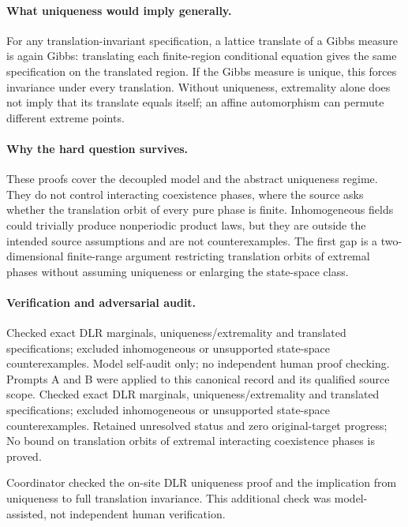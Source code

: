\documentclass[11pt]{article}
\begin{document}
\paragraph{What uniqueness would imply generally.} For any translation-invariant specification, a lattice translate of a Gibbs measure is again Gibbs: translating each finite-region conditional equation gives the same specification on the translated region. If the Gibbs measure is unique, this forces invariance under every translation. Without uniqueness, extremality alone does not imply that its translate equals itself; an affine automorphism can permute different extreme points.

\paragraph{Why the hard question survives.} These proofs cover the decoupled model and the abstract uniqueness regime. They do not control interacting coexistence phases, where the source asks whether the translation orbit of every pure phase is finite. Inhomogeneous fields could trivially produce nonperiodic product laws, but they are outside the intended source assumptions and are not counterexamples. The first gap is a two-dimensional finite-range argument restricting translation orbits of extremal phases without assuming uniqueness or enlarging the state-space class.

\paragraph{Verification and adversarial audit.}
Checked exact DLR marginals, uniqueness/extremality and translated specifications; excluded inhomogeneous or unsupported state-space counterexamples. Model self-audit only; no independent human proof checking. Prompts A and B were applied to this canonical record and its qualified source scope. Checked exact DLR marginals, uniqueness/extremality and translated specifications; excluded inhomogeneous or unsupported state-space counterexamples. Retained unresolved status and zero original-target progress; No bound on translation orbits of extremal interacting coexistence phases is proved.

Coordinator checked the on-site DLR uniqueness proof and the implication from uniqueness to full translation invariance. This additional check was model-assisted, not independent human verification.
\end{document}
